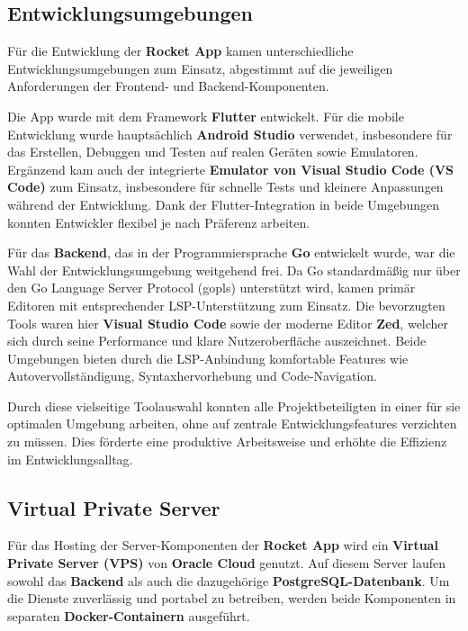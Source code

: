 \documentclass[11pt,a4paper]{article}
\begin{document}
\subsection{Entwicklungsumgebungen}

Für die Entwicklung der \textbf{Rocket App} kamen unterschiedliche Entwicklungsumgebungen zum Einsatz, abgestimmt auf die jeweiligen Anforderungen der Frontend- und Backend-Komponenten.

Die App wurde mit dem Framework \textbf{Flutter}\cite{flutter} entwickelt. Für die mobile Entwicklung wurde hauptsächlich \textbf{Android Studio}\cite{androidstudio} verwendet, insbesondere für das Erstellen, Debuggen und Testen auf realen Geräten sowie Emulatoren. Ergänzend kam auch der integrierte \textbf{Emulator von Visual Studio Code (VS Code)}\cite{VSCode} zum Einsatz, insbesondere für schnelle Tests und kleinere Anpassungen während der Entwicklung. Dank der Flutter-Integration in beide Umgebungen konnten Entwickler flexibel je nach Präferenz arbeiten.

Für das \textbf{Backend}, das in der Programmiersprache \textbf{Go}\cite{golang} entwickelt wurde, war die Wahl der Entwicklungsumgebung weitgehend frei. Da Go standardmäßig nur über den Go Language Server Protocol (gopls)\cite{gopls} unterstützt wird, kamen primär Editoren mit entsprechender LSP-Unterstützung zum Einsatz. Die bevorzugten Tools waren hier \textbf{Visual Studio Code}\cite{VSCode} sowie der moderne Editor \textbf{Zed}\cite{zed}, welcher sich durch seine Performance und klare Nutzeroberfläche auszeichnet. Beide Umgebungen bieten durch die LSP-Anbindung komfortable Features wie Autovervollständigung, Syntaxhervorhebung und Code-Navigation.

Durch diese vielseitige Toolauswahl konnten alle Projektbeteiligten in einer für sie optimalen Umgebung arbeiten, ohne auf zentrale Entwicklungsfeatures verzichten zu müssen. Dies förderte eine produktive Arbeitsweise und erhöhte die Effizienz im Entwicklungsalltag.

\subsection{Virtual Private Server}

Für das Hosting der Server-Komponenten der \textbf{Rocket App} wird ein \textbf{Virtual Private Server (VPS)} von \textbf{Oracle Cloud} genutzt. Auf diesem Server laufen sowohl das \textbf{Backend} als auch die dazugehörige \textbf{PostgreSQL-Datenbank}\cite{postgresql}. Um die Dienste zuverlässig und portabel zu betreiben, werden beide Komponenten in separaten \textbf{Docker-Containern}\cite{docker} ausgeführt.
\end{document}
